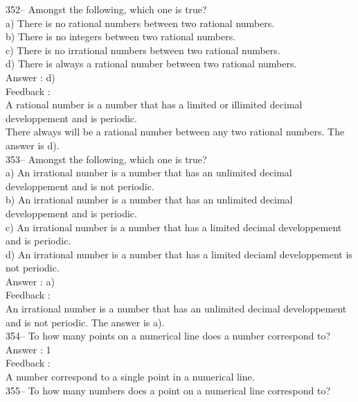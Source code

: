 ﻿\documentclass[letterpaper, 12pt]{article}
\begin{document}
352-- Amongst the following, which one is true?\\
a) There is no rational numbers between two rational numbers.\\
b) There is no integers between two rational numbers.\\
c) There is no irrational numbers between two rational numbers.\\
d) There is always a rational number between two rational numbers.\\

Answer : d)\\

Feedback :\\
A rational number is a number that has a limited or illimited decimal developpement and is periodic.\\
There always will be a rational number between any two rational numbers.
The answer is d).\\

353-- Amongst the following, which one is true?\\
a) An irrational number is a number that has an unlimited decimal developpement and is not periodic.\\
b) An irrational number is a number that has an unlimited decimal developpement and is periodic.\\
c) An irrational number is a number that has a limited decimal developpement and is periodic.\\
d) An irrational number is a number that has a limited deciaml developpement is not periodic.\\

Answer : a)\\

Feedback : \\
An irrational number is a number that has an unlimited decimal developpement and is not periodic. 
The answer is a).\\

354-- To how many points on a numerical line does a number correspond to?\\

Answer : 1\\

Feedback : \\
A number correspond to a single point in a numerical line.\\

355-- To how many numbers does a point on a numerical line correspond to?\\
\end{document}
